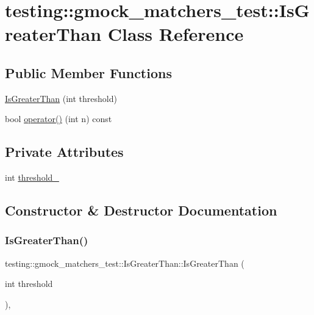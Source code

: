 \hypertarget{classtesting_1_1gmock__matchers__test_1_1_is_greater_than}{}\section{testing\+::gmock\+\_\+matchers\+\_\+test\+::Is\+Greater\+Than Class Reference}
\label{classtesting_1_1gmock__matchers__test_1_1_is_greater_than}
\subsection*{Public Member Functions}
\begin{DoxyCompactItemize}
\item 
\mbox{\hyperlink{classtesting_1_1gmock__matchers__test_1_1_is_greater_than_a6682979fb1ed5511995e575954d07aaf}{Is\+Greater\+Than}} (int threshold)
\item 
bool \mbox{\hyperlink{classtesting_1_1gmock__matchers__test_1_1_is_greater_than_a34b455148a2d299c654bc4443db0af67}{operator()}} (int n) const
\end{DoxyCompactItemize}
\subsection*{Private Attributes}
\begin{DoxyCompactItemize}
\item 
int \mbox{\hyperlink{classtesting_1_1gmock__matchers__test_1_1_is_greater_than_a053530553cd359c9eb53dd09db0a5805}{threshold\+\_\+}}
\end{DoxyCompactItemize}


\subsection{Constructor \& Destructor Documentation}
\mbox{\label{classtesting_1_1gmock__matchers__test_1_1_is_greater_than_a6682979fb1ed5511995e575954d07aaf}} 
\subsubsection{\texorpdfstring{IsGreaterThan()}{IsGreaterThan()}}
{\footnotesize\ttfamily testing\+::gmock\+\_\+matchers\+\_\+test\+::\+Is\+Greater\+Than\+::\+Is\+Greater\+Than (\begin{DoxyParamCaption}\item[{int}]{threshold }\end{DoxyParamCaption})\hspace{0.3cm}{\ttfamily [inline]}, {\ttfamily [explicit]}}



